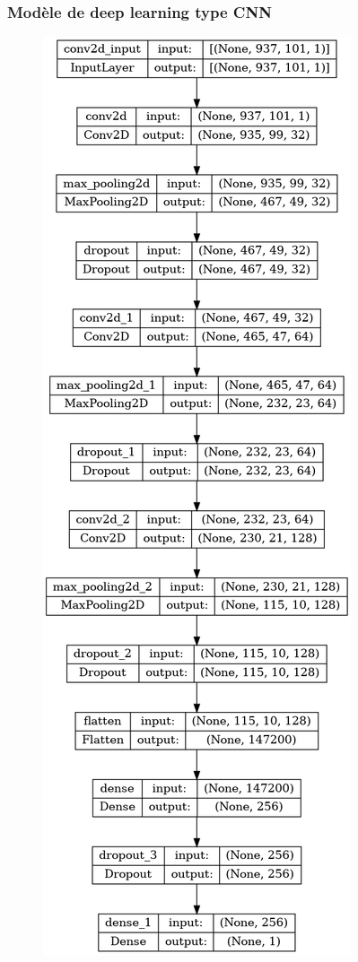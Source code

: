 \documentclass{beamer}
\theoremstyle{definition}
\begin{document}
\begin{frame}
	\frametitle{Modèle de deep learning type CNN }
	\begin{minipage}[t]{1\linewidth}
		\begin{minipage}[t]{0.42\linewidth}\centering\begin{figure}
				\centering
				\includegraphics[width=0.5\linewidth]{model2.png}\\[0.25cm]
				

\end{figure}
\end{minipage}
\end{minipage}
\end{frame}
\end{document}
